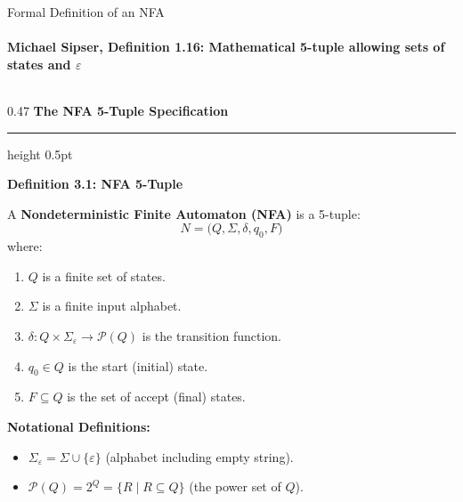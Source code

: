 \documentclass[aspectratio=169, 10pt]{beamer}
\newcommand{\colheader}[1]{%
  {\noindent\footnotesize\bfseries\color{gimpanavy}#1}%
  \vspace{0.02cm}%
  {\color{gimpanavy!30}\hrule height 0.5pt}%
  \vspace{0.05cm}%
}
\newcommand{\cardtitle}[1]{{\noindent\footnotesize\bfseries\color{gimpanavy}#1}\par\vspace{0.03cm}}
\begin{document}
\begin{frame}{Formal Definition of an NFA}
  \framesubtitle{Michael Sipser, Definition 1.16: Mathematical 5-tuple allowing sets of states and $\varepsilon$}
  
  \begin{columns}[T]
    \begin{column}{0.47\textwidth}
      \colheader{The NFA 5-Tuple Specification}
      \begin{tcolorbox}[conceptcard]
        \cardtitle{Definition 3.1: NFA 5-Tuple}
        {\scriptsize
        A \textbf{Nondeterministic Finite Automaton (NFA)} is a 5-tuple:
        \[ N = \bigl(Q, \Sigma, \delta, q_0, F\bigr) \]
        where:
        \begin{enumerate}\setlength{\itemsep}{1.5pt}\scriptsize
          \item $Q$ is a finite set of states.
          \item $\Sigma$ is a finite input alphabet.
          \item $\delta: Q \times \Sigma_\varepsilon \to \mathcal{P}(Q)$ is the transition function.
          \item $q_0 \in Q$ is the start (initial) state.
          \item $F \subseteq Q$ is the set of accept (final) states.
        \end{enumerate}
        \vspace{0.03cm}
        \textbf{Notational Definitions:}
        \begin{itemize}\setlength{\itemsep}{1pt}\scriptsize
          \item $\Sigma_\varepsilon = \Sigma \cup \{\varepsilon\}$ (alphabet including empty string).
          \item $\mathcal{P}(Q) = 2^Q = \{R \mid R \subseteq Q\}$ (the power set of $Q$).
        \end{itemize}
        }
      \end{tcolorbox}
    \end{column}
    

\end{columns}
\end{frame}
\end{document}
